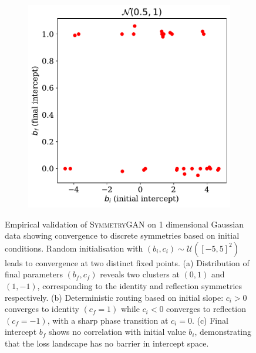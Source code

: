\begin{figure}
\begin{subfigure}[b]{0.31\textwidth}
        \caption{}
        \label{fig:Z2numeric_ii}
    \end{subfigure}
    \hfill
    \begin{subfigure}[b]{0.31\textwidth}
        \centering
        \includegraphics[width=\textwidth]{figures/chapter-09/b_ib_f.pdf}
        \caption{}
        \label{fig:Z2numeric_iii}
    \end{subfigure}
    \caption[Empirical validation of \textsc{SymmetryGAN} on 1 dimensional Gaussian data showing convergence to discrete symmetries based on initial conditions.]{Empirical validation of \textsc{SymmetryGAN} on 1 dimensional Gaussian data showing convergence to discrete symmetries based on initial conditions.
    Random initialisation with $(b_i, c_i) \sim \mathcal{U}([-5, 5]^2)$ leads to convergence at two distinct fixed points. (a) Distribution of final parameters $(b_f, c_f)$ reveals two clusters at $(0,1)$ and $(1,-1)$, corresponding to the identity and reflection symmetries respectively. (b) Deterministic routing based on initial slope: $c_i > 0$ converges to identity $(c_f = 1)$ while $c_i < 0$ converges to reflection $(c_f = -1)$, with a sharp phase transition at $c_i = 0$. (c) Final intercept $b_f$ shows no correlation with initial value $b_i$, demonstrating that the loss landscape has no barrier in intercept space.}
    \label{fig:Z2numeric}
\end{figure}
